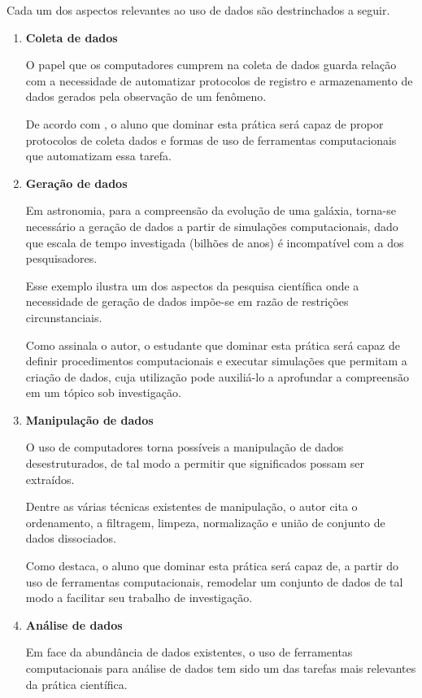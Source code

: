 Cada um dos aspectos relevantes ao uso de dados são destrinchados a seguir.


\begin{enumerate}
  \item \textbf{Coleta de dados}

  O papel que os computadores cumprem na coleta de dados guarda relação com a necessidade de automatizar protocolos de registro e armazenamento de dados gerados pela observação de um fenômeno.
  
  De acordo com , o aluno que dominar esta prática será capaz de propor  protocolos de coleta dados e formas de uso de ferramentas computacionais que automatizam essa tarefa.

  \item \textbf{Geração de dados}
  
  Em astronomia, para a compreensão da evolução de uma galáxia, torna-se necessário a geração de dados a partir de simulações computacionais, dado que escala de tempo investigada (bilhões de anos) é incompatível com a dos pesquisadores.

  Esse exemplo ilustra um dos aspectos da pesquisa científica onde a necessidade de geração de dados impõe-se em razão de restrições circunstanciais.

  Como assinala o autor, o estudante que dominar esta prática será capaz de definir procedimentos computacionais e executar simulações que permitam a criação de dados, cuja utilização pode auxiliá-lo a aprofundar a compreensão em um tópico sob investigação.

  \item \textbf{Manipulação de dados}

  O uso de computadores torna possíveis a manipulação de dados desestruturados, de tal modo a permitir que significados possam  ser extraídos. 

  Dentre as várias técnicas existentes de manipulação, o autor cita o ordenamento, a filtragem, limpeza, normalização e união de conjunto de dados dissociados. 
  
  Como destaca, o aluno que dominar esta prática será capaz de, a partir do uso de ferramentas computacionais, remodelar um conjunto de dados de tal modo a facilitar seu trabalho de investigação.

  \item \textbf{Análise de dados}

  Em face da abundância de dados existentes, o uso de ferramentas computacionais para análise de dados tem sido um das tarefas mais relevantes da prática científica.   
  

\end{enumerate}
